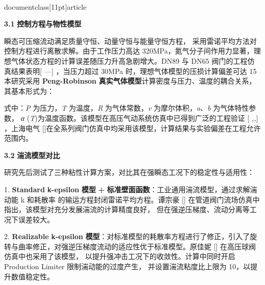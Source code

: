 \\documentclass[11pt]{article}
\begin{document}
\par
\textbf{3.1    }\textbf{控制方程与物性模型}\par

瞬态可压缩流动满足质量守恒、动量守恒与能量守恒方程， 采用雷诺平均方法对控制方程进行离散求解。由于工作压力高达 320MPa，氮气分子间作用力显著，理想气体状态方程的计算误差随压力升高急剧增大。DN89 与 DN65  阀门的工程仿真结果表明[ \textit{—}] ，当压力超过 30MPa 时，理想气体模型的压损计算偏差可达 15\\%

本研究采用 \textbf{Peng}\textbf{-}\textbf{Robinson}\textbf{ }\textbf{真实气体模型}计算密度与压力、温度的耦合关系， 其基本形式为：\par

\par
式中：\textit{P}\textit{ }为压力，\textit{T}\textit{ }为温度，\textit{R}\textit{ }为气体常数，\textit{v}\textit{ }为摩尔体积，\textit{a}、\textit{b}\textit{ }为气体特性参数， \textit{α}\textit{ }(\textit{T})为温度函数。该模型在高压气动系统仿真中已得到广泛的工程验证 [ \textit{,}\textit{,}] ，上海电气 [\cite{fe880629_9ce4_4876_a173_e24a97d827f4_基于数字孪生的管道阀门监测技术研究_谭宗豪}]在全系列阀门仿真中均采用该模型，计算结果与实验偏差在工程允许范围内。\par

\par
\textbf{3.2    }\textbf{湍流模型对比}\par

研究先后测试了三种粘性计算方案，对比其在强瞬态工况下的稳定性与适用性：\par

1.  \textbf{Standard}\textbf{ }\textbf{k}\textbf{-}\textbf{epsilon}\textbf{ }\textbf{模型} \textbf{+}\textbf{ }\textbf{标准壁面函数}：工业通用湍流模型，通过求解湍动能 k 和耗散率  的输运方程封闭雷诺平均方程。谭宗豪 [\cite{fe880629_9ce4_4876_a173_e24a97d827f4_基于数字孪生的管道阀门监测技术研究_谭宗豪}]  在管道阀门流场仿真中指出，该模型对充分发展湍流的计算精度良好， 但在强逆压梯度、流动分离等工况下误差较大。\par

2.  \textbf{Realizable}\textbf{ }\textbf{k}\textbf{-}\textbf{epsilon  }\textbf{模型}：对标准模型的耗散率方程进行了修正，引入了旋转与曲率修正，对强逆压梯度流动的适应性优于标准模型。原佳妮 [\cite{fe880629_9ce4_4876_a173_e24a97d827f4_基于数字孪生的管道阀门监测技术研究_谭宗豪}]  在高压球阀仿真中也采用了该模型， 以提升强冲击工况下的收敛性。计算中同时开启 Production Limiter 限制湍动能的过度产生， 并设置湍流粘度比上限为 10，以提升数值稳定性。\par
\end{document}

